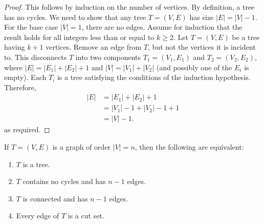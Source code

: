 \begin{proof}
This follows by induction on the number of
vertices. By definition, a tree has no cycles. We need to
show that any tree $T = (V,E)$ has size $|E| = |V| - 1$. For the base
case $|V| = 1$, there are no edges. Assume for induction that the
result holds for all integers less than or equal to $k \geq 2$. Let
$T = (V,E)$ be a tree having $k + 1$ vertices. Remove an edge from
$T$, but not the vertices it is incident to. This disconnects $T$ into
two components $T_1 = (V_1, E_1)$ and $T_2 = (V_2, E_2)$, where
$|E| = |E_1| + |E_2| + 1$ and $|V| = |V_1| + |V_2|$ (and possibly one
of the $E_i$ is empty). Each $T_i$ is a tree satisfying the conditions
of the induction hypothesis. Therefore,
\begin{align*}
|E|
&=
|E_1| + |E_2| + 1 \\[4pt]
&=
|V_1| - 1 + |V_2| - 1 + 1 \\[4pt]
&=
|V| - 1.
\end{align*}
as required.
\end{proof}

\begin{corollary}
If $T = (V,E)$ is a graph of order $|V| = n$, then the following are
equivalent:
\begin{enumerate}
\item\label{enu:trees_forests:is_tree} $T$ is a tree.

\item\label{enu:trees_forests:no_cycles_n_minus_one_edges} $T$
  contains no cycles and has $n - 1$ edges.

\item\label{enu:trees_forests:connected_n_minus_one_edges} $T$ is
  connected and has $n - 1$ edges.

\item\label{enu:trees_forests:each_edge_is_cut_set} Every edge of $T$
  is a cut set.
\end{enumerate}
\end{corollary}

